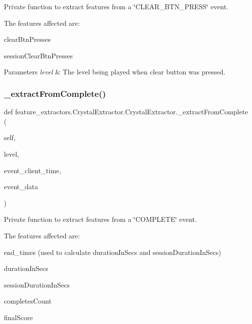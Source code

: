 Private function to extract features from a \char`\"{}\+C\+L\+E\+A\+R\+\_\+\+B\+T\+N\+\_\+\+P\+R\+E\+S\+S\char`\"{} event. 

The features affected are\+:
\begin{DoxyItemize}
\item clear\+Btn\+Presses
\item session\+Clear\+Btn\+Presses
\end{DoxyItemize}


\begin{DoxyParams}{Parameters}
{\em level} & The level being played when clear button was pressed. \\
\hline
\end{DoxyParams}
\mbox{\label{classfeature__extractors_1_1_crystal_extractor_1_1_crystal_extractor_a6e5f9339f47a3a6b84bf65285e330769}} 
\subsubsection{\texorpdfstring{\_extractFromComplete()}{\_extractFromComplete()}}
{\footnotesize\ttfamily def feature\+\_\+extractors.\+Crystal\+Extractor.\+Crystal\+Extractor.\+\_\+extract\+From\+Complete (\begin{DoxyParamCaption}\item[{}]{self,  }\item[{}]{level,  }\item[{}]{event\+\_\+client\+\_\+time,  }\item[{}]{event\+\_\+data }\end{DoxyParamCaption})\hspace{0.3cm}{\ttfamily [private]}}



Private function to extract features from a \char`\"{}\+C\+O\+M\+P\+L\+E\+T\+E\char`\"{} event. 

The features affected are\+:
\begin{DoxyItemize}
\item end\+\_\+times (used to calculate duration\+In\+Secs and session\+Duration\+In\+Secs)
\item duration\+In\+Secs
\item session\+Duration\+In\+Secs
\item completes\+Count
\item final\+Score
\end{DoxyItemize}


